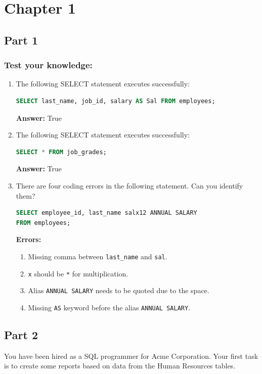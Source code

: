 \documentclass[a4paper,12pt]{article}
\begin{document}


\newpage
\section*{Chapter 1}
\subsection*{Part 1}
\subsubsection*{Test your knowledge:}

\begin{enumerate}
    \item The following SELECT statement executes successfully: 
    \begin{lstlisting}[language=SQL]
SELECT last_name, job_id, salary AS Sal FROM employees;
    \end{lstlisting}
    \textbf{Answer: } True

    \item The following SELECT statement executes successfully:
    \begin{lstlisting}[language=SQL]
SELECT * FROM job_grades;
    \end{lstlisting}
    \textbf{Answer: }True
    
    \item There are four coding errors in the following statement. Can you identify them? 
    \begin{lstlisting}[language=SQL]
SELECT employee_id, last_name salx12 ANNUAL SALARY 
FROM employees;
    \end{lstlisting}
    \textbf{Errors:}
    \begin{enumerate}
        \item Missing comma between \texttt{last\_name} and \texttt{sal}.
        \item \texttt{x} should be \texttt{*} for multiplication.
        \item Alias \texttt{ANNUAL SALARY} needs to be quoted due to the space.
        \item Missing \texttt{AS} keyword before the alias \texttt{ANNUAL SALARY}.
    \end{enumerate}

\end{enumerate}

\subsection*{Part 2}
You have been hired as a SQL programmer for Acme Corporation. Your first task is to create some
reports based on data from the Human Resources tables.
\end{document}
